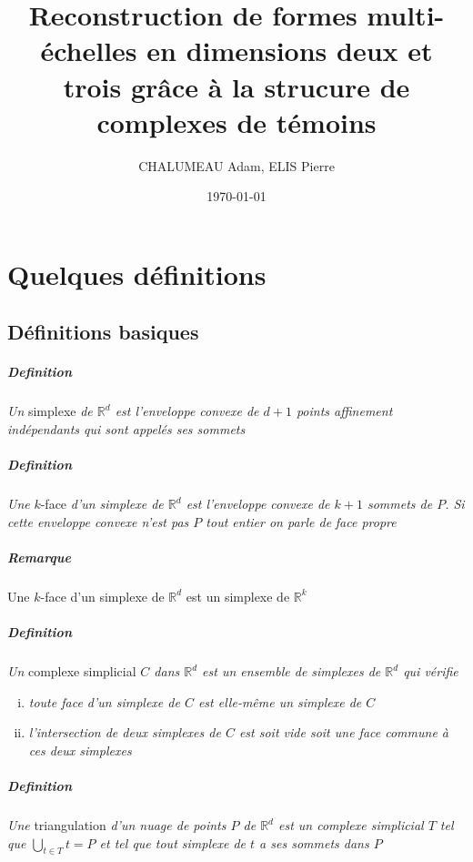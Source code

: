 \documentclass{report}
\title{\textbf{Reconstruction de formes multi-échelles en dimensions deux et trois grâce à la strucure de complexes de témoins}}
\author{CHALUMEAU Adam,	ELIS Pierre}
\date{\today}
\newcommand{\R}{\mathbb{R}}
\begin{document}
\maketitle

\appendix
\chapter{Quelques définitions}
\section{Définitions basiques}
\paragraph{Definition} \textit{Un }simplexe \textit{de $\R^d$ est l'enveloppe convexe de $d+1$ points affinement indépendants qui sont appelés ses sommets}
\paragraph{Definition} \textit{Une }$k$-face \textit{d'un simplexe de $\R^d$ est l'enveloppe convexe de $k+1$ sommets de $P$. Si cette enveloppe convexe n'est pas $P$ tout entier on parle de} \textit{face propre}
\paragraph{Remarque} Une $k$-face d'un simplexe de $\R^d$ est un simplexe de $\R^k$
\paragraph{Definition} \textit{Un }complexe simplicial \textit{$C$ dans $\R^d$ est un ensemble de simplexes de $\R^d$ qui vérifie}
\begin{enumerate}[(i)]
	\item \textit{toute face d'un simplexe de $C$ est elle-même un simplexe de $C$}
	\item \textit{l'intersection de deux simplexes de $C$ est soit vide soit une face commune à ces deux simplexes}
\end{enumerate}
\paragraph{Definition} \textit{Une }triangulation \textit{d'un nuage de points $P$ de $\R^d$ est un complexe simplicial $T$ tel que $\bigcup\limits_{t\in T}t = P$ et tel que tout simplexe de $t$ a ses sommets dans $P$}
\end{document}
